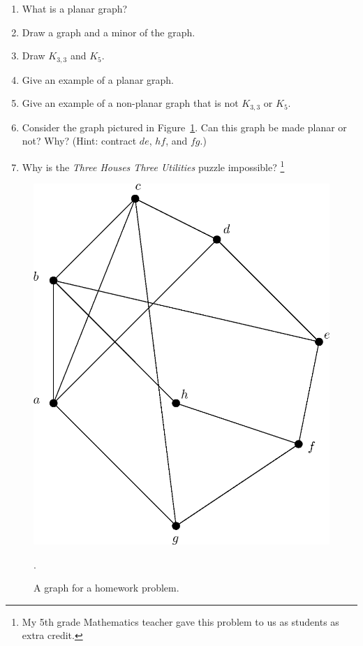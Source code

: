 \documentclass[11pt, letterpaper]{article}
\begin{document}
\begin{enumerate}
	\item What is a planar graph?
	\item Draw a graph and a minor of the graph. 
	\item Draw $K_{3,3}$ and $K_5$.
	\item Give an example of a planar graph.
	\item Give an example of a non-planar graph that is not $K_{3,3}$ or $K_5$.
	\item Consider the graph pictured in Figure~\ref{F:non-planar}. Can this graph be made planar or not? Why? (Hint: contract $de$, $hf$, and $fg$.)
	\item Why is the \emph{Three Houses Three Utilities} puzzle impossible? \footnote{My 5th grade Mathematics teacher gave this problem to us as students as extra credit.}
\end{enumerate}

	
\begin{figure}[h]
	\begin{center}
		\includegraphics[scale=0.25]{non-planar.eps}
	\end{center}
	\caption{A graph for a homework problem. }\label{F:non-planar}.
\end{figure}
\end{document}
